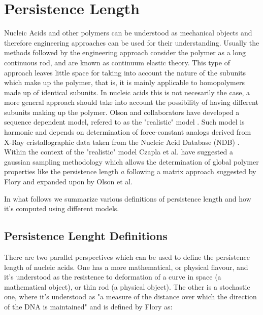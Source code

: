 \chapter{Persistence Length}
\label{appendix4a}

Nucleic  Acids and  other  polymers can  be  understood as  mechanical
objects   \cite{marko2003,  nelson2004}   and   therefore  engineering
approaches can  be used for their understanding.   Usually the methods
followed by  the engineering approach  consider the polymer as  a long
continuous rod, and  are known as continuum elastic  theory. This type
of approach leaves little space  for taking into account the nature of
the  subunits  which  make up  the  polymer,  that  is, it  is  mainly
applicable to  homopolymers made up of identical  subunits. In nucleic
acids this is not necesarily  the case, a more general approach should
take into account the  possibility of having different subunits making
up  the polymer.  Olson  and collaborators  have developed  a sequence
dependent model, refered to as the "realistic" model \cite{olson1993}.
Such model is harmonic  and depends on determination of force-constant
analogs  derived  from  X-Ray  cristallographic data  taken  from  the
Nucleic  Acid  Database  (NDB)  \cite{go1976, olson1998}.  Within  the
context of the "realistic" model Czapla et al.  \cite{czapla2006} have
suggested   a   gaussian  sampling   methodology   which  allows   the
determination of global polymer properties like the persistence length
$a$ following  a matrix  approach suggested by  Flory \cite{flory1969}
and expanded upon by Olson et al. \cite{maroun1988a, marky1994a}

In what follows we summarize various definitions of persistence length
and how it's computed using different models.
\section{Persistence Lenght Definitions}
There are  two parallel perspectives which  can be used  to define the
persistence length of nucleic acids.   One has a more mathematical, or
physical flavour, and it's understood as the resistence to deformation
of a curve  in space (a mathematical object), or  thin rod (a physical
object).  The other  is a stochastic one, where  it's understood as "a
measure  of  the distance  over  which the  direction  of  the DNA  is
maintained" \cite{olson1995} and is defined by Flory as:


